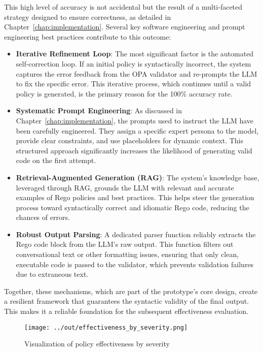 This high level of accuracy is not accidental but the result of a multi-faceted strategy designed to ensure correctness, as detailed in Chapter~\ref{chap:implementation}. Several key software engineering and prompt engineering best practices contribute to this outcome:
\begin{itemize}
    \item \textbf{Iterative Refinement Loop}: The most significant factor is the automated self-correction loop. If an initial policy is syntactically incorrect, the system captures the error feedback from the OPA validator and re-prompts the LLM to fix the specific error. This iterative process, which continues until a valid policy is generated, is the primary reason for the 100\% accuracy rate.
    \item \textbf{Systematic Prompt Engineering}: As discussed in Chapter~\ref{chap:implementation}, the prompts used to instruct the LLM have been carefully engineered. They assign a specific expert persona to the model, provide clear constraints, and use placeholders for dynamic context. This structured approach significantly increases the likelihood of generating valid code on the first attempt.
    \item \textbf{Retrieval-Augmented Generation (RAG)}: The system's knowledge base, leveraged through RAG, grounds the LLM with relevant and accurate examples of Rego policies and best practices. This helps steer the generation process toward syntactically correct and idiomatic Rego code, reducing the chances of errors.
    \item \textbf{Robust Output Parsing}: A dedicated parser function reliably extracts the Rego code block from the LLM's raw output. This function filters out conversational text or other formatting issues, ensuring that only clean, executable code is passed to the validator, which prevents validation failures due to extraneous text.
\end{itemize}
Together, these mechanisms, which are part of the prototype's core design, create a resilient framework that guarantees the syntactic validity of the final output. This makes it a reliable foundation for the subsequent effectiveness evaluation.

\begin{figure}[htbp]
	\centering
	\texttt{[image: ../out/effectiveness\_by\_severity.png]}
	\caption{Visualization of policy effectiveness by severity}\label{fig:effectiveness-plot}
\end{figure}

